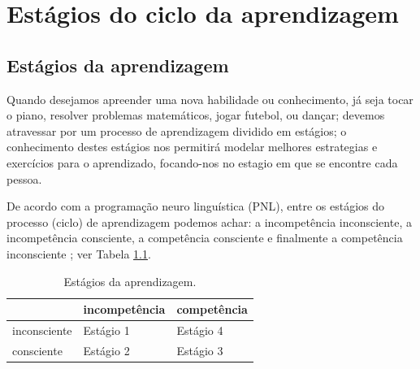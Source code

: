 
\chapter{Estágios do ciclo da aprendizagem}
\label{cap:aprendizagem}




\section{Estágios da aprendizagem}
\label{sec:aprendizagem}

Quando desejamos apreender uma nova habilidade ou conhecimento, já seja tocar o piano,
resolver problemas matemáticos,
jogar futebol, ou dançar; devemos atravessar por um processo de aprendizagem dividido em estágios;
o conhecimento destes estágios nos permitirá modelar melhores estrategias e exercícios para o aprendizado,
focando-nos no estagio em que se encontre cada pessoa.

De acordo com a programação neuro linguística (PNL), 
entre os estágios do processo (ciclo) de aprendizagem podemos achar:
a incompetência inconsciente, a incompetência consciente, 
a competência consciente e finalmente a competência inconsciente 
\cite[pp. 249]{seymourtreinando} \cite[pp. 10]{passadori7} \cite{de2013treinamentos};
ver Tabela \ref{tab:learning1}.

\begin{table}[!h]
  \centering
  \begin{tabular}{|l||l|l|}
   \hline
    ~             & incompetência & competência \\ \hline \hline
    inconsciente  & Estágio 1     & Estágio 4   \\ \hline
    consciente    & Estágio 2     & Estágio 3   \\ \hline
  \end{tabular}
  \caption{Estágios da aprendizagem.}
  \label{tab:learning1}
\end{table}

